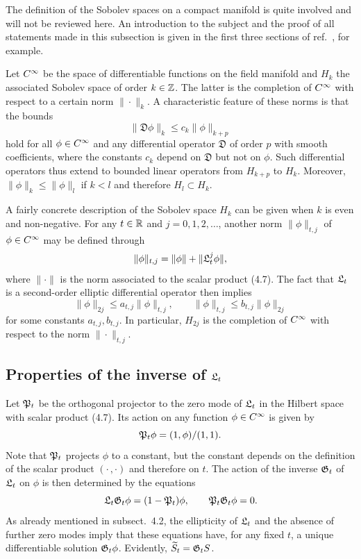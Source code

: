 The definition of the Sobolev spaces on a compact manifold
is quite involved and will not be reviewed here. An introduction
to the subject and the proof of all statements made in this subsection
is given in the first three sections of ref.~\cite{Gilkey},
for example.

Let $C^{\infty}$ be the space of differentiable functions on the field
manifold and $H_k$ the associated Sobolev space of order $k\in\mathbb{Z}$. The latter
is the completion of $C^{\infty}$ with respect to a certain norm $\|\cdot\|_k$.
A characteristic feature of these norms is that
the bounds
\begin{equation}
  \|\mathfrak{D}\phi\|_k\leq c_k\|\phi\|_{k+p}
\end{equation}
hold for all $\phi\in C^{\infty}$ and
any differential operator $\mathfrak{D}$ of order $p$
with smooth coefficients,
where the constants $c_k$ depend on $\mathfrak{D}$ but not on $\phi$.
Such differential operators thus extend to
bounded linear operators from $H_{k+p}$ to $H_k$.
Moreover,
$\|\phi\|_k\leq\|\phi\|_l$ if $k<l$
and therefore
$H_l\subset H_k$.

A fairly concrete description of the
Sobolev space $H_k$ can be given when $k$ is even
and non-negative. For any $t\in\mathbb{R}$ and $j=0,1,2,\ldots$,
another norm $\|\phi\|_{t,j}$ of $\phi\in C^{\infty}$
may be defined through
\begin{equation}
  \|\phi\|_{t,j}=\|\phi\|+\|\mathfrak{L}_t^j\phi\|,
\end{equation}
where $\|\cdot\|$ is the norm associated to the scalar product (4.7).
The fact that $\mathfrak{L}_t$ is a second-order elliptic differential operator
then implies
\begin{equation}
  \|\phi\|_{2j}\leq a_{t,j}\|\phi\|_{t,j},
  \qquad
  \|\phi\|_{t,j}\leq b_{t,j}\|\phi\|_{2j}
\end{equation}
for some constants $a_{t,j},b_{t,j}$.
In particular,
$H_{2j}$ is the completion of $C^{\infty}$ with respect to the
norm $\|\cdot\|_{t,j}$.


\subsection{Properties of the inverse of $\mathfrak{L}_t$}

Let $\mathfrak{P}_t$ be the orthogonal projector to the zero mode of $\mathfrak{L}_t$
in the Hilbert space with scalar product (4.7).
Its action on any function $\phi\in C^{\infty}$ is given by
\begin{equation}
  \mathfrak{P}_t\phi=(1,\phi)/(1,1).
\end{equation}
Note that $\mathfrak{P}_t$ projects $\phi$ to a constant, but the constant
depends on the definition of the scalar product $(\cdot\,,\cdot)$
and therefore on $t$.
The action of the inverse $\mathfrak{G}_t$ of $\mathfrak{L}_t$ on $\phi$
is then determined by the equations
\begin{equation}
  \mathfrak{L}_t\mathfrak{G}_t\phi=(1-\mathfrak{P}_t)\phi,
  \qquad
  \mathfrak{P}_t\mathfrak{G}_t\phi=0.
\end{equation}
As already mentioned in subsect.~4.2, the ellipticity of $\mathfrak{L}_t$
and the absence of further zero modes
imply that these equations have, for any fixed $t$,
a unique differentiable solution $\mathfrak{G}_t\phi$.
Evidently, $\widetilde{S}_t=\mathfrak{G}_t S$.

